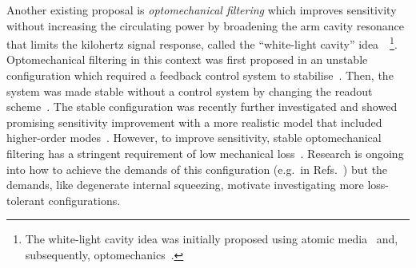 Another existing proposal is \emph{optomechanical filtering} which improves sensitivity without increasing the circulating power by broadening the arm cavity resonance that limits the kilohertz signal response, called the ``white-light cavity'' idea~\cite{miaoEnhancingBandwidthGravitationalWave2015}~\footnote{The white-light cavity idea was initially proposed using atomic media~\cite{WICHT1997431} and, subsequently, optomechanics~\cite{Qin:15}.}. %
Optomechanical filtering in this context was first proposed in an unstable configuration which required a feedback control system to stabilise~\cite{miaoEnhancingBandwidthGravitationalWave2015}. %
Then, the system was made stable without a control system by changing the readout scheme~\cite{liBroadbandSensitivityImprovement2020}. The stable configuration was recently further investigated and showed promising sensitivity improvement with a more realistic model that included higher-order modes~\cite{liEnhancingInterferometerSensitivity2021}. 
However, to improve sensitivity, stable optomechanical filtering has a stringent requirement of low mechanical loss~\cite{miaoEnhancingBandwidthGravitationalWave2015,liBroadbandSensitivityImprovement2020}. Research is ongoing into how to achieve the demands of this configuration (e.g.\ in Refs.~\cite{ying_2020,pageEnhancedDetectionHigh2018}) but the demands, like degenerate internal squeezing, motivate investigating more loss-tolerant configurations. 


